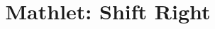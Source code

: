 \documentclass{ximera}
\title{Mathlet: Shift Right}
\begin{document}
\begin{abstract}
\end{abstract}

\maketitle
\end{document}
